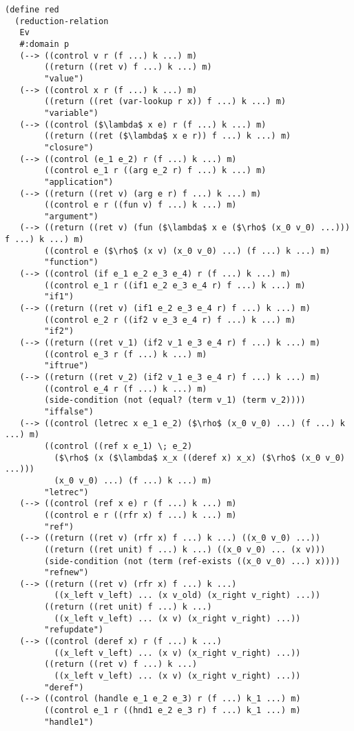 \documentclass[12pt,a4paper,twoside,openright]{report}
\begin{document}
\begin{lstlisting}[xleftmargin=0cm, xrightmargin=0cm]
(define red
  (reduction-relation
   Ev
   #:domain p
   (--> ((control v r (f ...) k ...) m)
        ((return ((ret v) f ...) k ...) m)
        "value")
   (--> ((control x r (f ...) k ...) m)
        ((return ((ret (var-lookup r x)) f ...) k ...) m)
        "variable")
   (--> ((control ($\lambda$ x e) r (f ...) k ...) m)
        ((return ((ret ($\lambda$ x e r)) f ...) k ...) m)
        "closure")
   (--> ((control (e_1 e_2) r (f ...) k ...) m)
        ((control e_1 r ((arg e_2 r) f ...) k ...) m)
        "application")
   (--> ((return ((ret v) (arg e r) f ...) k ...) m)
        ((control e r ((fun v) f ...) k ...) m)
        "argument")
   (--> ((return ((ret v) (fun ($\lambda$ x e ($\rho$ (x_0 v_0) ...))) f ...) k ...) m)
        ((control e ($\rho$ (x v) (x_0 v_0) ...) (f ...) k ...) m)
        "function")
   (--> ((control (if e_1 e_2 e_3 e_4) r (f ...) k ...) m)
        ((control e_1 r ((if1 e_2 e_3 e_4 r) f ...) k ...) m)
        "if1")
   (--> ((return ((ret v) (if1 e_2 e_3 e_4 r) f ...) k ...) m)
        ((control e_2 r ((if2 v e_3 e_4 r) f ...) k ...) m)
        "if2")
   (--> ((return ((ret v_1) (if2 v_1 e_3 e_4 r) f ...) k ...) m)
        ((control e_3 r (f ...) k ...) m)
        "iftrue")
   (--> ((return ((ret v_2) (if2 v_1 e_3 e_4 r) f ...) k ...) m)
        ((control e_4 r (f ...) k ...) m)
        (side-condition (not (equal? (term v_1) (term v_2))))
        "iffalse")
   (--> ((control (letrec x e_1 e_2) ($\rho$ (x_0 v_0) ...) (f ...) k ...) m)
        ((control ((ref x e_1) \; e_2) 
          ($\rho$ (x ($\lambda$ x_x ((deref x) x_x) ($\rho$ (x_0 v_0) ...)))
          (x_0 v_0) ...) (f ...) k ...) m)
        "letrec")
   (--> ((control (ref x e) r (f ...) k ...) m)
        ((control e r ((rfr x) f ...) k ...) m)
        "ref")
   (--> ((return ((ret v) (rfr x) f ...) k ...) ((x_0 v_0) ...))
        ((return ((ret unit) f ...) k ...) ((x_0 v_0) ... (x v)))
        (side-condition (not (term (ref-exists ((x_0 v_0) ...) x))))
        "refnew")
   (--> ((return ((ret v) (rfr x) f ...) k ...)
          ((x_left v_left) ... (x v_old) (x_right v_right) ...))
        ((return ((ret unit) f ...) k ...)
          ((x_left v_left) ... (x v) (x_right v_right) ...))
        "refupdate")
   (--> ((control (deref x) r (f ...) k ...)
          ((x_left v_left) ... (x v) (x_right v_right) ...))
        ((return ((ret v) f ...) k ...)
          ((x_left v_left) ... (x v) (x_right v_right) ...))
        "deref")
   (--> ((control (handle e_1 e_2 e_3) r (f ...) k_1 ...) m)
        ((control e_1 r ((hnd1 e_2 e_3 r) f ...) k_1 ...) m)
        "handle1")

\end{lstlisting}
\end{document}
